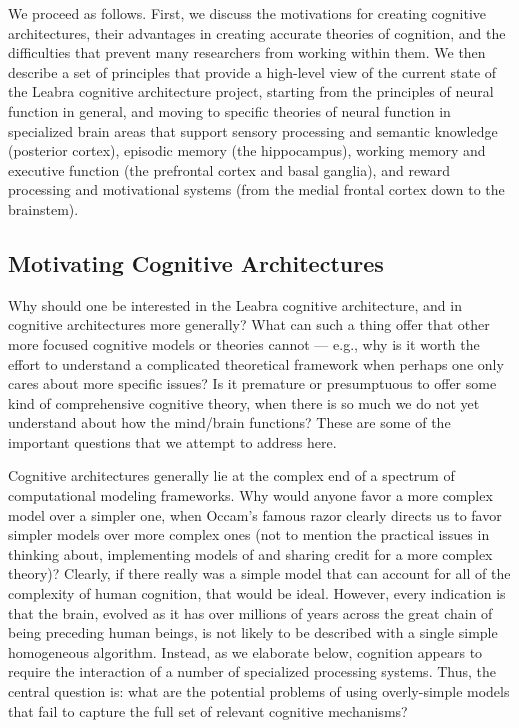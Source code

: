 \documentclass[11pt,twoside]{article}
\begin{document}
We proceed as follows.  First, we discuss the motivations for creating
cognitive architectures, their advantages in creating accurate theories of
cognition, and the difficulties that prevent many researchers from working
within them.  We then describe a set of principles that provide a high-level
view of the current state of the Leabra cognitive architecture project,
starting from the principles of neural function in general, and moving to
specific theories of neural function in specialized brain areas that support
sensory processing and semantic knowledge (posterior cortex), episodic memory
(the hippocampus), working memory and executive function (the prefrontal
cortex and basal ganglia), and reward processing and motivational systems
(from the medial frontal cortex down to the brainstem).

\subsection{Motivating Cognitive Architectures}

Why should one be interested in the Leabra cognitive architecture, and in
cognitive architectures more generally?  What can such a thing offer that
other more focused cognitive models or theories cannot --- e.g., why is it
worth the effort to understand a complicated theoretical framework when
perhaps one only cares about more specific issues?  Is it premature or
presumptuous to offer some kind of comprehensive cognitive theory, when there
is so much we do not yet understand about how the mind/brain functions?  These
are some of the important questions that we attempt to address here.

Cognitive architectures generally lie at the complex end of a spectrum of
computational modeling frameworks.  Why would anyone favor a more complex
model over a simpler one, when Occam's famous razor clearly directs us to
favor simpler models over more complex ones (not to mention the practical
issues in thinking about, implementing models of and sharing credit for a more
complex theory)?  Clearly, if there really was a simple model that can account
for all of the complexity of human cognition, that would be ideal.  However,
every indication is that the brain, evolved as it has over millions of years
across the great chain of being preceding human beings, is not likely to be
described with a single simple homogeneous algorithm.  Instead, as we
elaborate below, cognition appears to require the interaction of a number of
specialized processing systems.  Thus, the central question is: what are the
potential problems of using overly-simple models that fail to capture the full
set of relevant cognitive mechanisms?
\end{document}
